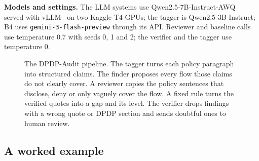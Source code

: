 \documentclass[11pt,a4paper]{article}
\begin{document}
\textbf{Models and settings.} The LLM systems use Qwen2.5-7B-Instruct-AWQ~\cite{qwen25} served with
vLLM~\cite{vllm} on two Kaggle T4 GPUs; the tagger is Qwen2.5-3B-Instruct; B4 uses
\texttt{gemini-3-flash-preview} through its API. Reviewer and baseline calls use temperature 0.7
with seeds 0, 1 and 2; the verifier and the tagger use temperature 0.

\begin{figure}[H]
\centering
{}
\caption{The DPDP-Audit pipeline. The tagger turns each policy paragraph into structured claims.
The finder proposes every flow those claims do not clearly cover. A reviewer copies the policy
sentences that disclose, deny or only vaguely cover the flow. A fixed rule turns the verified
quotes into a gap and its level. The verifier drops findings with a wrong quote or DPDP section and
sends doubtful ones to human review.}
\end{figure}

\subsection{A worked example}
\end{document}
